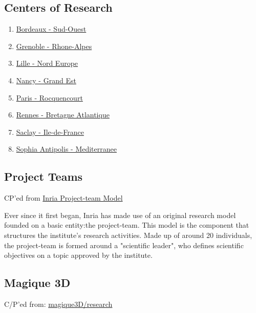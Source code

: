 \subsection{Centers of Research}

\begin{enumerate}
\item \href{http://www.inria.fr/centre/bordeaux}{Bordeaux - Sud-Ouest}
\item \href{http://www.inria.fr/centre/grenoble}{Grenoble - Rhone-Alpes}
\item \href{http://www.inria.fr/centre/lille}{Lille - Nord Europe}
\item \href{http://www.inria.fr/centre/nancy}{Nancy - Grand Est}
\item \href{http://www.inria.fr/centre/paris-rocquencourt}{Paris - Rocquencourt}
\item \href{http://www.inria.fr/centre/rennes}{Rennes - Bretagne Atlantique}
\item \href{http://www.inria.fr/centre/saclay}{Saclay - Ile-de-France}
\item \href{http://www.inria.fr/centre/sophia}{Sophia Antipolis - Mediterranee}
\end{enumerate}

\subsection{Project Teams}
CP'ed from \href{http://www.inria.fr/en/research/research-teams/project-team-model}{Inria Project-team Model}

Ever since it first began, Inria has made use of an original research model founded on a basic entity:the project-team. This model is the component that structures the institute's research activities. Made up of around 20 individuals, the project-team is formed around a "scientific leader", who defines scientific objectives on a topic approved by the institute.


\subsection{Magique 3D}

C/P'ed from: \href{https://team.inria.fr/magique3d/research/}{magique3D/research}

